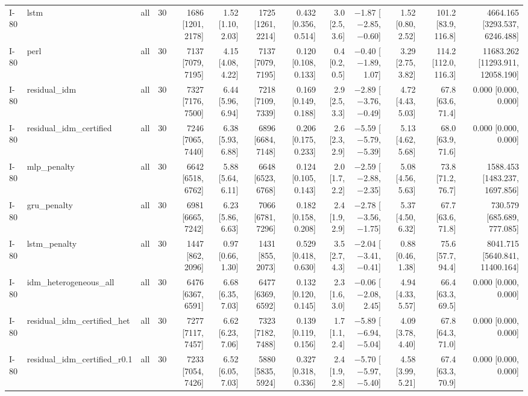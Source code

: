 \begin{table}[htbp]
{\begin{tabular}{lllrrrrrrrrrr}
I-80 & lstm & all & 30 & 1686 [1201, 2178] & 1.52 [1.10, 2.03] & 1725 [1261, 2214] & 0.432 [0.356, 0.514] & 3.0 [2.5, 3.6] & $-$1.87 [$-$2.85, $-$0.60] & 1.52 [0.80, 2.52] & 101.2 [83.9, 116.8] & 4664.165 [3293.537, 6246.488] \\
I-80 & perl & all & 30 & 7137 [7079, 7195] & 4.15 [4.08, 4.22] & 7137 [7079, 7195] & 0.120 [0.108, 0.133] & 0.4 [0.2, 0.5] & $-$0.40 [$-$1.89, 1.07] & 3.29 [2.75, 3.82] & 114.2 [112.0, 116.3] & 11683.262 [11293.911, 12058.190] \\
I-80 & residual\_idm & all & 30 & 7327 [7176, 7500] & 6.44 [5.96, 6.94] & 7218 [7109, 7339] & 0.169 [0.149, 0.188] & 2.9 [2.5, 3.3] & $-$2.89 [$-$3.76, $-$0.49] & 4.72 [4.43, 5.03] & 67.8 [63.6, 71.4] & 0.000 [0.000, 0.000] \\
I-80 & residual\_idm\_certified & all & 30 & 7246 [7065, 7440] & 6.38 [5.93, 6.88] & 6896 [6684, 7148] & 0.206 [0.175, 0.233] & 2.6 [2.3, 2.9] & $-$5.59 [$-$5.79, $-$5.39] & 5.13 [4.62, 5.68] & 68.0 [63.9, 71.6] & 0.000 [0.000, 0.000] \\
I-80 & mlp\_penalty & all & 30 & 6642 [6518, 6762] & 5.88 [5.64, 6.11] & 6648 [6523, 6768] & 0.124 [0.105, 0.143] & 2.0 [1.7, 2.2] & $-$2.59 [$-$2.88, $-$2.35] & 5.08 [4.56, 5.63] & 73.8 [71.2, 76.7] & 1588.453 [1483.237, 1697.856] \\
I-80 & gru\_penalty & all & 30 & 6981 [6665, 7242] & 6.23 [5.86, 6.63] & 7066 [6781, 7296] & 0.182 [0.158, 0.208] & 2.4 [1.9, 2.9] & $-$2.78 [$-$3.56, $-$1.75] & 5.37 [4.50, 6.32] & 67.7 [63.6, 71.8] & 730.579 [685.689, 777.085] \\
I-80 & lstm\_penalty & all & 30 & 1447 [862, 2096] & 0.97 [0.66, 1.30] & 1431 [855, 2073] & 0.529 [0.418, 0.630] & 3.5 [2.7, 4.3] & $-$2.04 [$-$3.41, $-$0.41] & 0.88 [0.46, 1.38] & 75.6 [57.7, 94.4] & 8041.715 [5640.841, 11400.164] \\
I-80 & idm\_heterogeneous\_all & all & 30 & 6476 [6367, 6591] & 6.68 [6.35, 7.03] & 6477 [6369, 6592] & 0.132 [0.120, 0.145] & 2.3 [1.6, 3.0] & $-$0.06 [$-$2.08, 2.45] & 4.94 [4.33, 5.57] & 66.4 [63.3, 69.5] & 0.000 [0.000, 0.000] \\
I-80 & residual\_idm\_certified\_het & all & 30 & 7277 [7117, 7457] & 6.62 [6.23, 7.06] & 7323 [7182, 7488] & 0.139 [0.119, 0.156] & 1.7 [1.1, 2.4] & $-$5.89 [$-$6.94, $-$5.04] & 4.09 [3.78, 4.40] & 67.8 [64.3, 71.0] & 0.000 [0.000, 0.000] \\
I-80 & residual\_idm\_certified\_r0.1 & all & 30 & 7233 [7054, 7426] & 6.52 [6.05, 7.03] & 5880 [5835, 5924] & 0.327 [0.318, 0.336] & 2.4 [1.9, 2.8] & $-$5.70 [$-$5.97, $-$5.40] & 4.58 [3.99, 5.21] & 67.4 [63.3, 70.9] & 0.000 [0.000, 0.000] \\

\end{tabular}}
\end{table}

